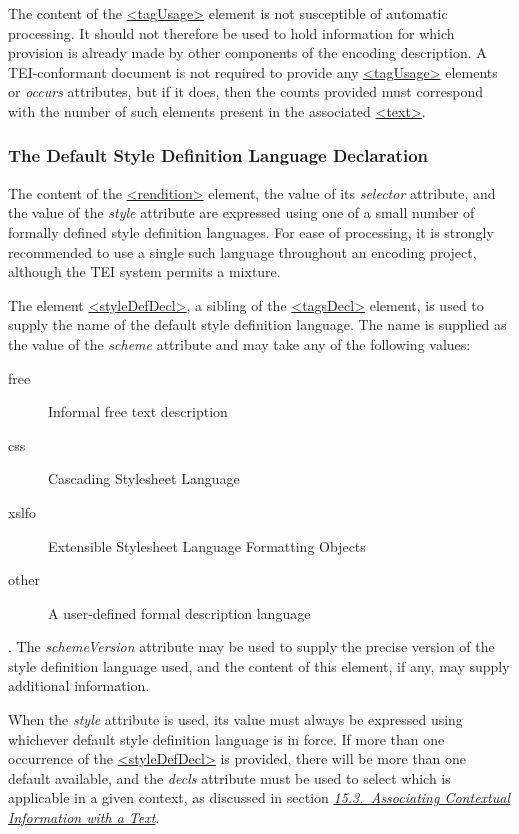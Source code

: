 The content of the \hyperref[TEI.tagUsage]{<tagUsage>} element is not susceptible of automatic processing. It should not therefore be used to hold information for which provision is already made by other components of the encoding description. A TEI-conformant document is not required to provide any \hyperref[TEI.tagUsage]{<tagUsage>} elements or {\itshape occurs} attributes, but if it does, then the counts provided must correspond with the number of such elements present in the associated \hyperref[TEI.text]{<text>}.
\subsubsection[{The Default Style Definition Language Declaration}]{The Default Style Definition Language Declaration}\label{HD57-1a}\par
The content of the \hyperref[TEI.rendition]{<rendition>} element, the value of its {\itshape selector} attribute, and the value of the {\itshape style} attribute are expressed using one of a small number of formally defined style definition languages. For ease of processing, it is strongly recommended to use a single such language throughout an encoding project, although the TEI system permits a mixture.\par
The element \hyperref[TEI.styleDefDecl]{<styleDefDecl>}, a sibling of the \hyperref[TEI.tagsDecl]{<tagsDecl>} element, is used to supply the name of the default style definition language. The name is supplied as the value of the {\itshape scheme} attribute and may take any of the following values:  \begin{description}

\item[{free}]Informal free text description
\item[{css}]Cascading Stylesheet Language
\item[{xslfo}]Extensible Stylesheet Language Formatting Objects
\item[{other}]A user-defined formal description language
\end{description} . The {\itshape schemeVersion} attribute may be used to supply the precise version of the style definition language used, and the content of this element, if any, may supply additional information.\par
When the {\itshape style} attribute is used, its value must always be expressed using whichever default style definition language is in force. If more than one occurrence of the \hyperref[TEI.styleDefDecl]{<styleDefDecl>} is provided, there will be more than one default available, and the {\itshape decls} attribute must be used to select which is applicable in a given context, as discussed in section \textit{\hyperref[CCAS]{15.3.\ Associating Contextual Information with a Text}}.
